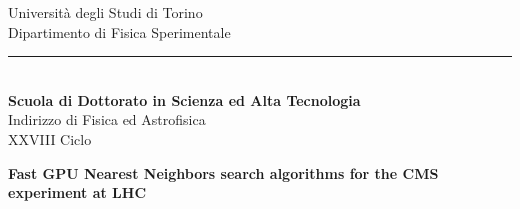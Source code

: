 \thispagestyle{empty}
\begin{center}
{\LARGE Universit\`a degli Studi di Torino}\\ \vspace{0.2cm}
{\large Dipartimento di Fisica Sperimentale}
\rule{150mm}{0.5mm}
\begin{figure}[h]
\centering
{}
\end{figure}
\\ \vspace{0.1cm}
{\Large \bf Scuola di Dottorato in Scienza ed Alta Tecnologia}\\ \vspace{0.1cm}
{\Large Indirizzo di Fisica ed Astrofisica}\\ \vspace{0.2cm}
{\Large XXVIII Ciclo}

\vspace{1.0cm}
\Huge{ \textbf{Fast GPU Nearest Neighbors search algorithms for the CMS experiment at LHC}}

\end{center}

